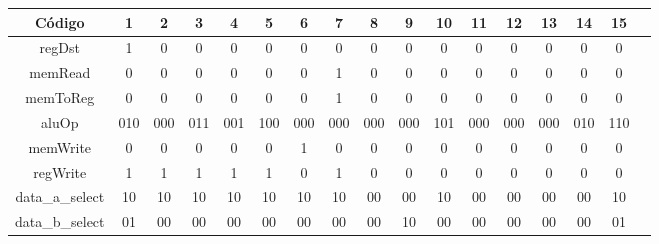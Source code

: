 	\begin{center}
		\begin{longtable}[pos]{| c | c | c | c | c | c | c | c | c | c | c | c | c | c | c | c | c |} \hline
			\multicolumn{1}{|c|}{\cellcolor[gray]{0.9}\textbf{\small Código}} & 
			\multicolumn{1}{c|}{\cellcolor[gray]{0.9}\textbf{1}} & 
			\multicolumn{1}{c|}{\cellcolor[gray]{0.9}\textbf{2}} &
			\multicolumn{1}{c|}{\cellcolor[gray]{0.9}\textbf{3}} &
            \multicolumn{1}{c|}{\cellcolor[gray]{0.9}\textbf{4}} &
            \multicolumn{1}{c|}{\cellcolor[gray]{0.9}\textbf{5}} &
            \multicolumn{1}{c|}{\cellcolor[gray]{0.9}\textbf{6}} &
            \multicolumn{1}{c|}{\cellcolor[gray]{0.9}\textbf{7}} &
            \multicolumn{1}{c|}{\cellcolor[gray]{0.9}\textbf{8}} &
            \multicolumn{1}{c|}{\cellcolor[gray]{0.9}\textbf{9}} &
            \multicolumn{1}{c|}{\cellcolor[gray]{0.9}\textbf{10}} &
			\multicolumn{1}{c|}{\cellcolor[gray]{0.9}\textbf{11}} &
			\multicolumn{1}{c|}{\cellcolor[gray]{0.9}\textbf{12}} &
            \multicolumn{1}{c|}{\cellcolor[gray]{0.9}\textbf{13}} &
            \multicolumn{1}{c|}{\cellcolor[gray]{0.9}\textbf{14}} &
            \multicolumn{1}{c|}{\cellcolor[gray]{0.9}\textbf{15}} \\ \hline
			\endhead
			\hline
			\endlastfoot
			
			\small regDst 			& 1   & 0   & 0   & 0   & 0   & 0   & 0   & 0   & 0   & 0   & 0   & 0   & 0  & 0 & 0 \\ \hline
            \small memRead 			& 0   & 0   & 0   & 0   & 0   & 0   & 1   & 0   & 0   & 0   & 0   & 0   & 0  & 0 & 0\\ \hline
            \small memToReg 		& 0   & 0   & 0   & 0   & 0   & 0   & 1   & 0   & 0   & 0   & 0   & 0   & 0  & 0 & 0 \\ \hline
            
            \small aluOp 			& \small 010 & \small 000 & \small 011 & \small 001 & \small 100 & \small 000 & \small 000 & \small 000 & \small 000 & \small 101 & \small 000 & \small 000 & \small 000 & \small 010 & \small 110\\ \hline
            
            \small memWrite 		& 0   & 0   & 0   & 0   & 0   & 1   & 0   & 0   & 0   & 0   & 0   & 0   & 0  & 0 & 0\\ \hline
            \small regWrite 		& 1   & 1   & 1   & 1   & 1   & 0   & 1   & 0   & 0   & 0   & 0   & 0   & 0  & 0 & 0 \\ \hline
            \small data\_a\_select	& 10  & 10  & 10  & 10  & 10  & 10  & 10  & 00  & 00  & 10  & 00  & 00  & 00 & 00 & 10\\ \hline
            \small data\_b\_select 	& 01  & 00  & 00  & 00  & 00  & 00  & 00  & 00  & 10  & 00  & 00  & 00  & 00 & 00 & 01\\ \hline
            

\end{longtable}
\end{center}

